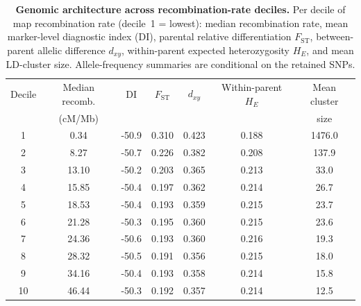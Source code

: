 \begin{table}[h]
\centering
\caption{\textbf{Genomic architecture across recombination-rate deciles.}
Per decile of map recombination rate (decile~1 = lowest): median recombination
rate, mean marker-level diagnostic index (DI), parental relative differentiation
$F_{\mathrm{ST}}$, between-parent allelic difference $d_{xy}$, within-parent
expected heterozygosity $H_E$, and mean LD-cluster size. Allele-frequency
summaries are conditional on the retained SNPs.}
\label{tabS:architecture_deciles}
\small
\begin{tabular}{ccccccc}
\toprule
Decile & Median recomb. & DI & $F_{\mathrm{ST}}$ & $d_{xy}$ & Within-parent $H_E$ & Mean cluster \\
       & (cM/Mb)        &    &                   &          &                     & size \\
\midrule
1 & 0.34 & -50.9 & 0.310 & 0.423 & 0.188 & 1476.0 \\
2 & 8.27 & -50.7 & 0.226 & 0.382 & 0.208 & 137.9 \\
3 & 13.10 & -50.2 & 0.203 & 0.365 & 0.213 & 33.0 \\
4 & 15.85 & -50.4 & 0.197 & 0.362 & 0.214 & 26.7 \\
5 & 18.53 & -50.4 & 0.193 & 0.359 & 0.215 & 23.7 \\
6 & 21.28 & -50.3 & 0.195 & 0.360 & 0.215 & 23.6 \\
7 & 24.36 & -50.6 & 0.193 & 0.360 & 0.216 & 19.3 \\
8 & 28.32 & -50.5 & 0.191 & 0.356 & 0.215 & 18.0 \\
9 & 34.16 & -50.4 & 0.193 & 0.358 & 0.214 & 15.8 \\
10 & 46.44 & -50.3 & 0.192 & 0.357 & 0.214 & 12.5 \\
\bottomrule
\end{tabular}
\end{table}
